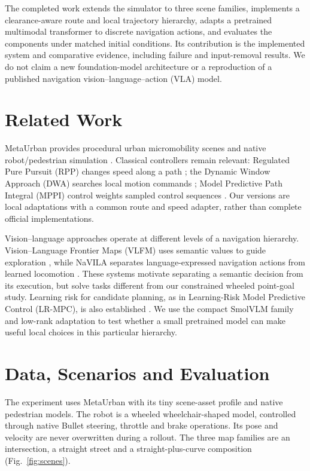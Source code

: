 \documentclass[10pt,a4paper]{article}
\begin{document}
The completed work extends the simulator to three scene families, implements a clearance-aware route and local trajectory hierarchy, adapts a pretrained multimodal transformer to discrete navigation actions, and evaluates the components under matched initial conditions. Its contribution is the implemented system and comparative evidence, including failure and input-removal results. We do not claim a new foundation-model architecture or a reproduction of a published navigation vision--language--action (VLA) model.

\section{Related Work}
MetaUrban provides procedural urban micromobility scenes and native robot/pedestrian simulation \cite{metaurban}. Classical controllers remain relevant: Regulated Pure Pursuit (RPP) changes speed along a path \cite{rpp}; the Dynamic Window Approach (DWA) searches local motion commands \cite{dwa}; Model Predictive Path Integral (MPPI) control weights sampled control sequences \cite{mppi}. Our versions are local adaptations with a common route and speed adapter, rather than complete official implementations.

Vision--language approaches operate at different levels of a navigation hierarchy. Vision--Language Frontier Maps (VLFM) uses semantic values to guide exploration \cite{vlfm}, while NaVILA separates language-expressed navigation actions from learned locomotion \cite{navila}. These systems motivate separating a semantic decision from its execution, but solve tasks different from our constrained wheeled point-goal study. Learning risk for candidate planning, as in Learning-Risk Model Predictive Control (LR-MPC), is also established \cite{lrmcp}. We use the compact SmolVLM family \cite{smolvlm} and low-rank adaptation \cite{lora} to test whether a small pretrained model can make useful local choices in this particular hierarchy.

\section{Data, Scenarios and Evaluation}
The experiment uses MetaUrban with its tiny scene-asset profile and native pedestrian models. The robot is a wheeled wheelchair-shaped model, controlled through native Bullet steering, throttle and brake operations. Its pose and velocity are never overwritten during a rollout. The three map families are an intersection, a straight street and a straight-plus-curve composition (Fig.~\ref{fig:scenes}).
\end{document}

